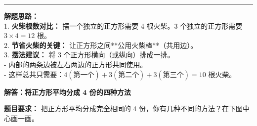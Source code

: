 \vspace{1.0cm}
\hrule
\vspace{0.4cm}

{\small
\textbf{解题思路：} \\
1. \textbf{火柴根数对比：} 摆一个独立的正方形需要 4 根火柴。3 个独立的正方形需要 $3 \times 4 = 12$ 根。 \\
2. \textbf{节省火柴的关键：} 让正方形之间**公用火柴棒**（共用边）。 \\
3. \textbf{摆法建议：} 将 3 个正方形横向（或纵向）排成一排。 \\
   - 内部的两条边被左右两边的正方形共同使用。 \\
   - 这样总共只需要：$4 (\text{第一个}) + 3 (\text{第二个}) + 3 (\text{第三个}) = 10$ 根火柴。
}




\newpage

\begin{center}
  {\large\bfseries 解答：将正方形平均分成 4 份的四种方法}
\end{center}

\vspace{0.6cm}

\noindent
{\small \textbf{题目要求：} 把正方形平均分成完全相同的 4 份，你有几种不同的方法？在下图中心画一画。}

\vspace{1.0cm}

